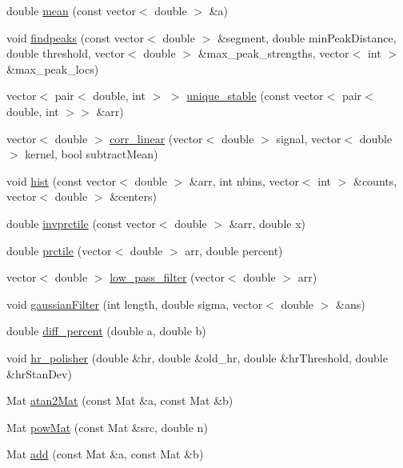 \begin{DoxyCompactItemize}
double \hyperlink{namespace_m_h_r_af6125176deb7b4d4d503a4bcf851a076}{mean} (const vector$<$ double $>$ \&a)
\item 
void \hyperlink{namespace_m_h_r_ad11b22e616f937a6817faa9a0c72ec21}{findpeaks} (const vector$<$ double $>$ \&segment, double min\+Peak\+Distance, double threshold, vector$<$ double $>$ \&max\+\_\+peak\+\_\+strengths, vector$<$ int $>$ \&max\+\_\+peak\+\_\+locs)
\item 
vector$<$ pair$<$ double, int $>$ $>$ \hyperlink{namespace_m_h_r_a22cd3e8872333ff4c203c15821bf69bb}{unique\+\_\+stable} (const vector$<$ pair$<$ double, int $>$$>$ \&arr)
\item 
vector$<$ double $>$ \hyperlink{namespace_m_h_r_a4e7d8efbc84874e131049dc705488cc9}{corr\+\_\+linear} (vector$<$ double $>$ signal, vector$<$ double $>$ kernel, bool subtract\+Mean)
\item 
void \hyperlink{namespace_m_h_r_ab46344d4248f6c55622fef14c1eb78c7}{hist} (const vector$<$ double $>$ \&arr, int nbins, vector$<$ int $>$ \&counts, vector$<$ double $>$ \&centers)
\item 
double \hyperlink{namespace_m_h_r_a4d04157ea7582bbd0a165e1a8a679219}{invprctile} (const vector$<$ double $>$ \&arr, double x)
\item 
double \hyperlink{namespace_m_h_r_a401757908f80823dd6c6ced91e55d751}{prctile} (vector$<$ double $>$ arr, double percent)
\item 
vector$<$ double $>$ \hyperlink{namespace_m_h_r_af85b8b218e683bde30d7ee0329b29716}{low\+\_\+pass\+\_\+filter} (vector$<$ double $>$ arr)
\item 
void \hyperlink{namespace_m_h_r_a0380a36a3a26da3c0a32e0f4b3d9fec9}{gaussian\+Filter} (int length, double sigma, vector$<$ double $>$ \&ans)
\item 
double \hyperlink{namespace_m_h_r_a2e51d3fdfa37bc717ccc0c4557d64445}{diff\+\_\+percent} (double a, double b)
\item 
void \hyperlink{namespace_m_h_r_a8612a874ea7842e4b65969e11f1c2416}{hr\+\_\+polisher} (double \&hr, double \&old\+\_\+hr, double \&hr\+Threshold, double \&hr\+Stan\+Dev)
\item 
Mat \hyperlink{namespace_m_h_r_ad90e260536ab41e3da12f739038743d0}{atan2\+Mat} (const Mat \&a, const Mat \&b)
\item 
Mat \hyperlink{namespace_m_h_r_afef7e1a6e6fe95a9debb07c2d7ba3008}{pow\+Mat} (const Mat \&src, double n)
\item 
Mat \hyperlink{namespace_m_h_r_ac0d7c563ab4072cf5cba2d2b1cb3761e}{add} (const Mat \&a, const Mat \&b)
$$
\end{DoxyCompactItemize}
